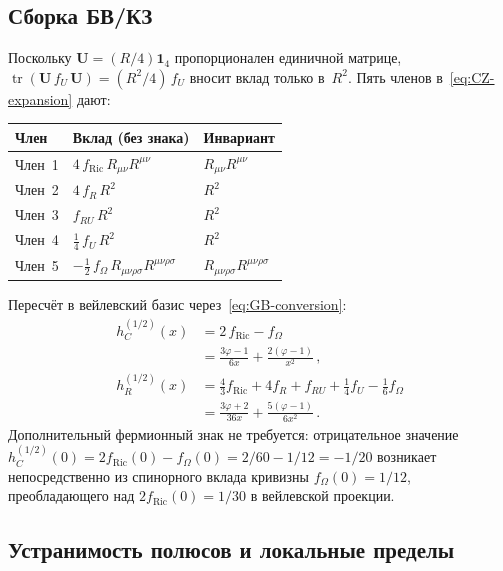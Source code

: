 \documentclass[aps,prd,twocolumn,superscriptaddress,nofootinbib,floatfix]{revtex4-2}
\theoremstyle{definition}
\theoremstyle{remark}
\newcommand{\Ricsq}{R_{\mu\nu}R^{\mu\nu}}
\newcommand{\Riemsq}{R_{\mu\nu\rho\sigma}R^{\mu\nu\rho\sigma}}
\newcommand{\tr}{\operatorname{tr}}
\begin{document}
\subsection{Сборка БВ/КЗ}

Поскольку $\mathbf{U} = (R/4)\mathbf{1}_4$ пропорционален единичной
матрице, $\tr(\mathbf{U}\,f_U\,\mathbf{U}) = (R^2/4)\,f_U$ вносит вклад
только в~$R^2$. Пять членов в~\eqref{eq:CZ-expansion} дают:
\begin{center}
\renewcommand{\arraystretch}{1.15}
\begin{tabular}{@{}lll@{}}
  \toprule
  Член & Вклад (без знака) & Инвариант \\
  \midrule
  Член~1 & $4\,f_{\text{Ric}}\,\Ricsq$ & $\Ricsq$ \\
  Член~2 & $4\,f_R\,R^2$ & $R^2$ \\
  Член~3 & $f_{RU}\,R^2$ & $R^2$ \\
  Член~4 & $\tfrac{1}{4}\,f_U\,R^2$ & $R^2$ \\
  Член~5 & $-\tfrac{1}{2}\,f_\Omega\,\Riemsq$ & $\Riemsq$ \\
  \bottomrule
\end{tabular}
\end{center}

Пересчёт в вейлевский базис через~\eqref{eq:GB-conversion}:
\begin{subequations}
\label{eq:dirac-ff}
\begin{align}
  h_C^{(1/2)}(x) &= 2\,f_{\text{Ric}} - f_\Omega
  \label{eq:hC12-assembly}\\
  &= \frac{3\varphi - 1}{6x} + \frac{2(\varphi - 1)}{x^2}\,,
  \label{eq:hC12}\\[4pt]
  h_R^{(1/2)}(x) &= \tfrac{4}{3}f_{\text{Ric}} + 4f_R
    + f_{RU} + \tfrac{1}{4}f_U - \tfrac{1}{6}f_\Omega
  \label{eq:hR12-assembly}\\
  &= \frac{3\varphi + 2}{36x} + \frac{5(\varphi - 1)}{6x^2}\,.
  \label{eq:hR12}
\end{align}
\end{subequations}
Дополнительный фермионный знак не требуется: отрицательное значение
$h_C^{(1/2)}(0) = 2f_{\text{Ric}}(0) - f_\Omega(0)
= 2/60 - 1/12 = -1/20$ возникает непосредственно из спинорного вклада
кривизны $f_\Omega(0) = 1/12$, преобладающего над
$2f_{\text{Ric}}(0) = 1/30$ в вейлевской проекции.

\subsection{Устранимость полюсов и локальные пределы}
\end{document}
